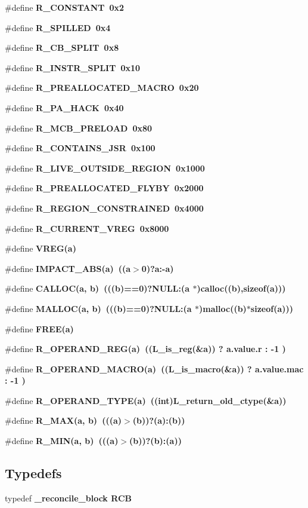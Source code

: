 \begin{CompactItemize}
\#define \bf{R\_\-CONSTANT}~0x2
\item 
\#define \bf{R\_\-SPILLED}~0x4
\item 
\#define \bf{R\_\-CB\_\-SPLIT}~0x8
\item 
\#define \bf{R\_\-INSTR\_\-SPLIT}~0x10
\item 
\#define \bf{R\_\-PREALLOCATED\_\-MACRO}~0x20
\item 
\#define \bf{R\_\-PA\_\-HACK}~0x40
\item 
\#define \bf{R\_\-MCB\_\-PRELOAD}~0x80
\item 
\#define \bf{R\_\-CONTAINS\_\-JSR}~0x100
\item 
\#define \bf{R\_\-LIVE\_\-OUTSIDE\_\-REGION}~0x1000
\item 
\#define \bf{R\_\-PREALLOCATED\_\-FLYBY}~0x2000
\item 
\#define \bf{R\_\-REGION\_\-CONSTRAINED}~0x4000
\item 
\#define \bf{R\_\-CURRENT\_\-VREG}~0x8000
\item 
\#define \bf{VREG}(a)
\item 
\#define \bf{IMPACT\_\-ABS}(a)~((a$>$0)?a:-a)
\item 
\#define \bf{CALLOC}(a, b)~(((b)==0)?NULL:(a $\ast$)calloc((b),sizeof(a)))
\item 
\#define \bf{MALLOC}(a, b)~(((b)==0)?NULL:(a $\ast$)malloc((b)$\ast$sizeof(a)))
\item 
\#define \bf{FREE}(a)
\item 
\#define \bf{R\_\-OPERAND\_\-REG}(a)~((L\_\-is\_\-reg(\&a)) ? a.value.r : -1 )
\item 
\#define \bf{R\_\-OPERAND\_\-MACRO}(a)~((L\_\-is\_\-macro(\&a)) ? a.value.mac : -1 )
\item 
\#define \bf{R\_\-OPERAND\_\-TYPE}(a)~((int)L\_\-return\_\-old\_\-ctype(\&a))
\item 
\#define \bf{R\_\-MAX}(a, b)~(((a)$>$(b))?(a):(b))
\item 
\#define \bf{R\_\-MIN}(a, b)~(((a)$>$(b))?(b):(a))
\end{CompactItemize}
\subsection*{Typedefs}
\begin{CompactItemize}
\item 
typedef \bf{\_\-reconcile\_\-block} \bf{RCB}
\end{CompactItemize}
